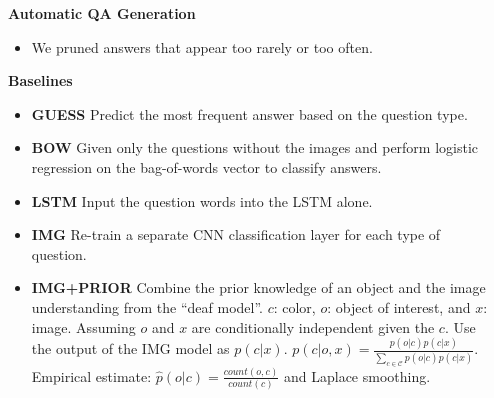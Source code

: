\documentclass{beamer}
\renewcommand{\*}[1]{\textbf{#1}}
\begin{document}
\begin{frame}{}
\begin{columns}[T]
\begin{column}{0.32\linewidth}
\begin{block}{\bf{\large Automatic QA Generation}}
\begin{itemize}
\begin{figure}[h!]

\vspace{5mm}
\end{figure}

\item We pruned answers that appear too rarely or too often.
\end{itemize}

\end{block}
\vfill

\begin{block}{\bf{\large Baselines}}
\begin{itemize}
\item \*{GUESS} Predict the most frequent answer based on the question type.

\item \*{BOW} Given only the questions without the images and perform logistic
regression on the bag-of-words vector to classify answers.

\item \*{LSTM} Input the question words into the LSTM alone.

\item \*{IMG} Re-train a separate CNN classification layer for each type of
question.

\item \*{IMG+PRIOR} Combine the prior knowledge of an object and the image
understanding from the ``deaf model''. $c$: color, $o$: object of interest, and
$x$: image. Assuming $o$ and $x$ are conditionally independent given the $c$.
Use the output of the IMG model as $p(c | x)$. $p(c | o, x) = \frac{p(o | c)
p(c | x)}{\sum_{c \in \mathcal{C}} p(o | c) p(c | x)}$. Empirical estimate:
$\hat{p}(o | c) = \frac{count(o, c)}{count(c)}$ and Laplace smoothing.
\end{itemize}
\end{block}
\vfill

\endminipage
\end{column}

\begin{column}{0.32\linewidth}
\minipage[t][0.9\textheight][s]{\columnwidth}


\end{column}
\end{columns}
\end{frame}
\end{document}
